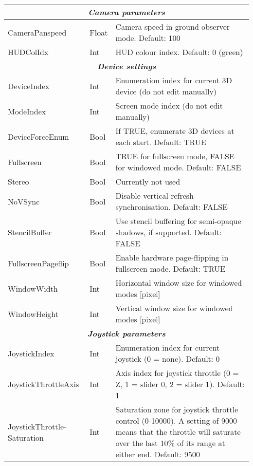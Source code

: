 \documentclass[Orbiter Developer Manual.tex]{subfiles}
\begin{document}
\begin{longtable}{ |p{}|p{}|p{}| }
	\hline
	\multicolumn{3}{|c|}{\rule{0pt}{2ex}\textbf{\textit{Camera parameters}}}\\
	\hline\rule{0pt}{2ex}
	CameraPanspeed & Float & Camera speed in ground observer mode. Default: 100\\
	\hline\rule{0pt}{2ex}
	HUDColIdx & Int & HUD colour index. Default: 0 (green)\\
	\hline
	\multicolumn{3}{|c|}{\rule{0pt}{2ex}\textbf{\textit{Device settings}}}\\
	\hline\rule{0pt}{2ex}
	DeviceIndex & Int & Enumeration index for current 3D device (do not edit manually)\\
	\hline\rule{0pt}{2ex}
	ModeIndex & Int & Screen mode index (do not edit manually)\\
	\hline\rule{0pt}{2ex}
	DeviceForceEnum & Bool & If TRUE, enumerate 3D devices at each start. Default: TRUE\\
	\hline\rule{0pt}{2ex}
	Fullscreen & Bool & TRUE for fullscreen mode, FALSE for windowed mode. Default: FALSE\\
	\hline\rule{0pt}{2ex}
	Stereo & Bool & Currently not used\\
	\hline\rule{0pt}{2ex}
	NoVSync & Bool & Disable vertical refresh synchronisation. Default: FALSE\\
	\hline\rule{0pt}{2ex}
	StencilBuffer & Bool & Use stencil buffering for semi-opaque shadows, if supported. Default: FALSE\\
	\hline\rule{0pt}{2ex}
	FullscreenPageflip & Bool & Enable hardware page-flipping in fullscreen mode. Default: TRUE\\
	\hline\rule{0pt}{2ex}
	WindowWidth & Int & Horizontal window size for windowed modes [pixel]\\
	\hline\rule{0pt}{2ex}
	WindowHeight & Int & Vertical window size for windowed modes [pixel]\\
	\hline
	\multicolumn{3}{|c|}{\rule{0pt}{2ex}\textbf{\textit{Joystick parameters}}}\\
	\hline\rule{0pt}{2ex}
	JoystickIndex & Int & Enumeration index for current joystick (0 = none). Default: 0\\
	\hline\rule{0pt}{2ex}
	JoystickThrottleAxis & Int & Axis index for joystick throttle (0 = Z, 1 = slider 0, 2 = slider 1). Default: 1\\
	\hline\rule{0pt}{2ex}
	JoystickThrottle­Saturation & Int & Saturation zone for joystick throttle control (0-10000). A setting of 9000 means that the throttle will saturate over the last 10\% of its range at either end. Default: 9500\\

\end{longtable}
\end{document}
